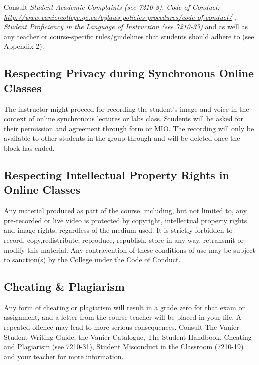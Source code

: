 \documentclass[
  10pt,
]{article}
\begin{document}
Consult \emph{Student Academic Complaints (see 7210-8), Code of Conduct:
\url{http://www.vaniercollege.qc.ca/bylaws-policies-procedures/code-of-conduct/}
, Student Proficiency in the Language of Instruction (see 7210-33)} and
as well as any teacher or course-specific rules/guidelines that students
should adhere to (see Appendix 2).

\hypertarget{respecting-privacy-during-synchronous-online-classes}{%
\subsection*{Respecting Privacy during Synchronous Online
Classes}\label{respecting-privacy-during-synchronous-online-classes}}

The instructor might proceed for recording the student's image and voice
in the context of online synchronous lectures or labs class. Students
will be asked for their permission and agreement through form or MIO.
The recording will only be available to other students in the group
through and will be deleted once the block has ended.

\hypertarget{respecting-intellectual-property-rights-in-online-classes}{%
\subsection*{Respecting Intellectual Property Rights in Online
Classes}\label{respecting-intellectual-property-rights-in-online-classes}}

Any material produced as part of the course, including, but not limited
to, any pre-recorded or live video is protected by copyright,
intellectual property rights and image rights, regardless of the medium
used. It is strictly forbidden to record, copy,redistribute, reproduce,
republish, store in any way, retransmit or modify this material. Any
contravention of these conditions of use may be subject to sanction(s)
by the College under the Code of Conduct.

\hypertarget{cheating-plagiarism}{%
\subsection*{Cheating \& Plagiarism}\label{cheating-plagiarism}}

Any form of cheating or plagiarism will result in a grade zero for that
exam or assignment, and a letter from the course teacher will be placed
in your file. A repeated offence may lead to more serious consequences.
Consult The Vanier Student Writing Guide, the Vanier Catalogue, The
Student Handbook, Cheating and Plagiarism (see 7210-31), Student
Misconduct in the Classroom (7210-19) and your teacher for more
information.
\end{document}
